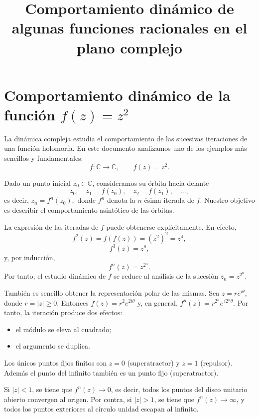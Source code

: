 \documentclass[11pt,a4paper]{article}
\title{Comportamiento dinámico de algunas funciones racionales en el plano complejo}
\author{}
\date{}
\begin{document}
      \maketitle
      
       \section{Comportamiento dinámico de la función \(f(z)=z^2\)} 
       
       La dinámica compleja estudia el comportamiento de las sucesivas iteraciones de una función holomorfa. En este documento analizamos uno de los ejemplos más sencillos y fundamentales: 
       \[ f:\mathbb{C}\longrightarrow\mathbb{C}, \qquad f(z)=z^2. \] 
       
       Dado un punto inicial \(z_0\in\mathbb{C}\), consideramos su órbita hacia delante 
       \[ z_0,\quad z_1=f(z_0),\quad z_2=f(z_1),\quad \ldots, \] 
       es decir, $z_n=f^{n}(z_0),$ donde \(f^{n}\) denota la \(n\)-ésima iterada de \(f\). Nuestro objetivo es describir el comportamiento asintótico de las órbitas. 
       
   La expresión de las iteradas de \(f\) puede obtenerse explícitamente. En efecto, 
   \[ f^2(z)=f(f(z))=(z^2)^2=z^4, \]
    \[ f^3(z)=z^8, \] 
    y, por inducción, \[ f^n(z)=z^{2^n}. \] 
  Por tanto, el estudio dinámico de \(f\) se reduce al análisis de la sucesión $z_n=z^{2^n}. $
       
También es sencillo obtener la representación polar de las mismas.  Sea $z=re^{i\theta},$ donde \(r=|z|\ge 0\). Entonces $f(z) = r^2 e^{2i\theta}$ y, en general, $f^{n}(z) = r^{2^n}e^{\,i2^n\theta}.$ Por tanto, la iteración produce dos efectos: 
\begin{itemize}
 \item el módulo se eleva al cuadrado; 
 \item el argumento se duplica.
  \end{itemize} 

  
 Los únicos puntos fijos finitos  son $z=0$ (superatractor) y $ z=1$ (repulsor). Además el punto del infinito también es un punto fijo (superatractor).
 
 
 
 Si $|z|<1$, se tiene que $f^n(z)\longrightarrow 0$, es decir, todos los puntos del disco unitario abierto convergen al origen. Por contra, si   $|z|>1$, se tiene que $f^n(z)\longrightarrow \infty$, y todos los puntos exteriores al círculo unidad escapan al infinito. 
 
\end{document}
